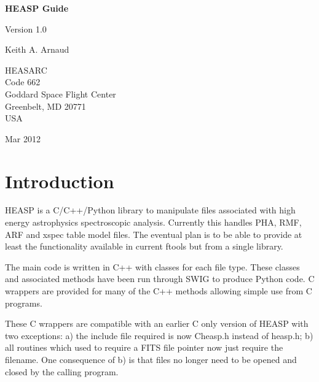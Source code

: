 \documentclass[11pt]{book}
\begin{document}
\begin{titlepage}
\normalsize
\vspace*{4.0cm}
\begin{center}
{\Huge \bf HEASP Guide}\\
\end{center}
\medskip
\medskip
\begin{center}
{\Large Version 1.0 \\}
\end{center}
\bigskip
\begin{center}
{\Large Keith A. Arnaud \\}
\end{center}
\medskip
\medskip
\begin{center}
{HEASARC\\
Code 662\\
Goddard Space Flight Center\\
Greenbelt, MD 20771\\
USA}
\end{center}

\vfill
\bigskip
\begin{center}
{\Large Mar 2012\\}
\end{center}
\vfill
\end{titlepage}


\tableofcontents
{}
\chapter{Introduction}

HEASP is a C/C++/Python library to manipulate files associated with
high energy astrophysics spectroscopic analysis. Currently this
handles PHA, RMF, ARF and xspec table model files. The eventual plan 
is to be able to provide at least the functionality available in 
current ftools but from a single library.

The main code is written in C++ with classes for each file type. These
classes and associated methods have been run through SWIG to produce
Python code. C wrappers are provided for many of the C++ methods
allowing simple use from C programs.

These C wrappers are compatible
with an earlier C only version of HEASP with two exceptions: a) the
include file required is now Cheasp.h instead of heasp.h; b) all
routines which used to require a FITS file pointer now just require
the filename. One consequence of b) is that files no longer need to be
opened and closed by the calling program.
\end{document}
